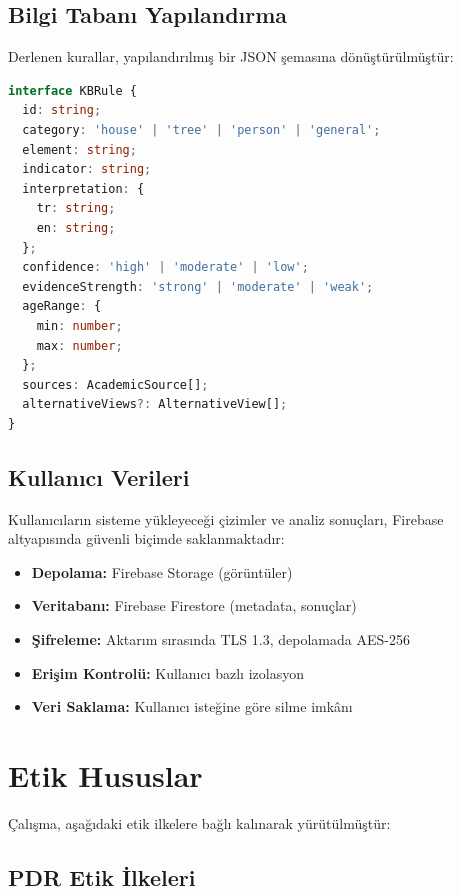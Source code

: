 \subsection{Bilgi Tabanı Yapılandırma}

Derlenen kurallar, yapılandırılmış bir JSON şemasına dönüştürülmüştür:

\begin{lstlisting}[language=TypeScript, caption=Bilgi Tabanı Veri Yapısı]
interface KBRule {
  id: string;
  category: 'house' | 'tree' | 'person' | 'general';
  element: string;
  indicator: string;
  interpretation: {
    tr: string;
    en: string;
  };
  confidence: 'high' | 'moderate' | 'low';
  evidenceStrength: 'strong' | 'moderate' | 'weak';
  ageRange: {
    min: number;
    max: number;
  };
  sources: AcademicSource[];
  alternativeViews?: AlternativeView[];
}
\end{lstlisting}

\subsection{Kullanıcı Verileri}

Kullanıcıların sisteme yükleyeceği çizimler ve analiz sonuçları, Firebase altyapısında güvenli biçimde saklanmaktadır:

\begin{itemize}
  \item \textbf{Depolama:} Firebase Storage (görüntüler)
  \item \textbf{Veritabanı:} Firebase Firestore (metadata, sonuçlar)
  \item \textbf{Şifreleme:} Aktarım sırasında TLS 1.3, depolamada AES-256
  \item \textbf{Erişim Kontrolü:} Kullanıcı bazlı izolasyon
  \item \textbf{Veri Saklama:} Kullanıcı isteğine göre silme imkânı
\end{itemize}

\section{Etik Hususlar}

Çalışma, aşağıdaki etik ilkelere bağlı kalınarak yürütülmüştür:

\subsection{PDR Etik İlkeleri}

